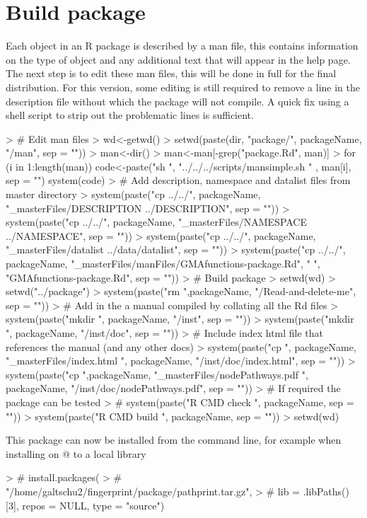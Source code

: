 \documentclass{article}
\renewenvironment{Schunk}{\vspace{\topsep}}{\vspace{\topsep}}
\begin{document}
\section{Build package}
Each object in an R package is described by a man file, this contains information on the type of object and any additional text that will appear in the help page. The next step is to edit these man files, this will be done in full for the final distribution. For this version, some editing is still required to remove a line in the description file without which the package will not compile. A quick fix using a shell script to strip out the problematic lines is sufficient.
\begin{Schunk}
\begin{Sinput}
> # Edit man files
> wd<-getwd()
> setwd(paste(dir, "package/", packageName, "/man", sep = ""))
> man<-dir()
> man<-man[-grep("package.Rd", man)]
> for (i in 1:length(man)){
   code<-paste("sh ", "../../../scripts/mansimple.sh " , man[i], sep = "")
   system(code)
 }
> # Add description, namespace and datalist files from master directory
> system(paste("cp ../../", packageName,
              "_masterFiles/DESCRIPTION ../DESCRIPTION", sep = ""))
> system(paste("cp ../../", packageName,
              "_masterFiles/NAMESPACE ../NAMESPACE", sep = ""))
> system(paste("cp ../../", packageName,
              "_masterFiles/datalist ../data/datalist", sep = ""))
> system(paste("cp ../../", packageName,
               "_masterFiles/manFiles/GMAfunctions-package.Rd",
               " ", "GMAfunctions-package.Rd", sep = ""))
> # Build package
> setwd(wd)
> setwd("../package")
> system(paste("rm ",packageName, "/Read-and-delete-me", sep = ""))
> # Add in the a manual compiled by collating all the Rd files
> system(paste("mkdir ", packageName, "/inst", sep = ""))
> system(paste("mkdir ", packageName, "/inst/doc", sep = ""))
> # Include index html file that references the manual (and any other docs)
> system(paste("cp ", packageName, "_masterFiles/index.html ",
              packageName, "/inst/doc/index.html", sep = ""))
> system(paste("cp ",packageName, "_masterFiles/nodePathways.pdf ", packageName,
              "/inst/doc/nodePathways.pdf", sep = ""))
> # If required the package can be tested
> # system(paste("R CMD check ", packageName, sep = ""))
> system(paste("R CMD build ", packageName, sep = ""))
> setwd(wd)
\end{Sinput}
\end{Schunk}
This package can now be installed from the command line, for example when installing on @ to a local library
\begin{Schunk}
\begin{Sinput}
> # install.packages(
> # "/home/galtschu2/fingerprint/package/pathprint.tar.gz",
> # lib = .libPaths()[3], repos = NULL, type = "source")
\end{Sinput}
\end{Schunk}
\end{document}
